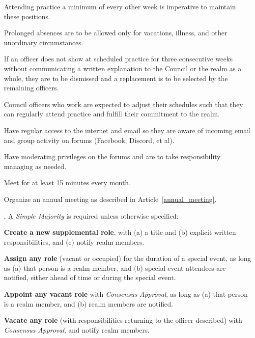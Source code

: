 \documentclass[12pt]{article}
\begin{document}
\begin{level}
\begin{level}
\begin{level}
            \begin{level}
                \item Attending practice a minimum of every other week is imperative to maintain these positions. 
                \item Prolonged absences are to be allowed only for vacations, illness, and other unordinary circumstances. 
                \item If an officer does not show at scheduled practice for three consecutive weeks without communicating a written explanation to the Council or the realm as a whole, they are to be dismissed and a replacement is to be selected by the remaining officers. 
                \item Council officers who work are expected to adjust their schedules such that they can regularly attend practice and fulfill their commitment to the realm.
            \end{level}   
            \item Have regular access to the internet and email so they are aware of incoming email and group activity on forums (Facebook, Discord, et al).
            \item Have moderating privileges on the forums and are to take responsibility managing as needed.
            \item Meet for at least 15 minutes every month.
            \item Organize an annual meeting as described in Article~\ref{annual_meeting}.
        \end{level}
        \item {}. A \emph{Simple Majority} is required unless otherwise specified:
        \begin{level}
            \item \textbf{Create a new supplemental role}, with (a) a title and (b) explicit written responsibilities, and (c) notify realm members.
            \item \textbf{Assign any role} (vacant or occupied) for the duration of a special event, as long as (a) that person is a realm member, and (b) special event attendees are notified, either ahead of time or during the special event.\label{temp_role}
            \item \textbf{Appoint any vacant role} with \emph{Consensus Approval}, as long as (a) that person is a realm member, and (b) realm members are notified.
            \item \textbf{Vacate any role} (with responsibilities returning to the officer described) with \emph{Consensus Approval}, and notify realm members.

\end{level}
\end{level}
\end{level}
\end{document}
